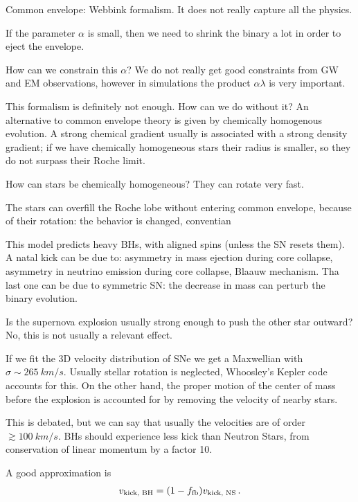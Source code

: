 \documentclass[main.tex]{subfiles}
\begin{document}

Common envelope: Webbink formalism. 
It does not really capture all the physics.

If the parameter \(\alpha \) is small, then we need to shrink the binary a lot in order to eject the envelope. 

How can we constrain this \(\alpha \)? 
We do not really get good constraints from GW and EM observations, however in simulations the product \(\alpha \lambda \) is very important. 

This formalism is definitely not enough.
How can we do without it? 
An alternative to common envelope theory is given by chemically homogenous evolution. 
A strong chemical gradient usually is associated with a strong density gradient; if we have chemically homogeneous stars their radius is smaller, so they do not surpass their Roche limit. 

How can stars be chemically homogeneous? They can rotate very fast.

The stars can overfill the Roche lobe without entering common envelope, because of their rotation: the behavior is changed, conventian

This model predicts heavy BHs, with aligned spins (unless the SN resets them). 
A natal kick can be due to: asymmetry in mass ejection during core collapse, asymmetry in neutrino emission during core collapse, Blaauw mechanism. 
Tha last one can be due to symmetric SN: the decrease in mass can perturb the binary evolution. 

Is the supernova explosion usually strong enough to push the other star outward? No, this is not usually a relevant effect.

If we fit the 3D velocity distribution of SNe we get a Maxwellian with \(\sigma \sim \SI{265}{km/s}\). 
Usually stellar rotation is neglected, Whoosley's Kepler code accounts for this. 
On the other hand, the proper motion of the center of mass before the explosion is accounted for by removing the velocity of nearby stars. 

This is debated, but we can say that usually the velocities are of order \(\gtrsim \SI{100}{km/s}\). 
BHs should experience less kick than Neutron Stars, from conservation of linear momentum by a factor 10.

A good approximation is 
%
\begin{align}
v _{\text{kick, BH}} = \qty(1 - f_{\text{fb}}) v _{\text{kick, NS}}
\,.
\end{align}
\end{document}
